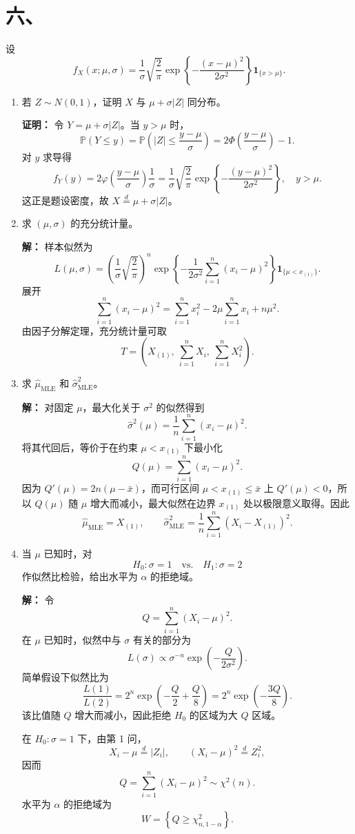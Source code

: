 \documentclass[UTF8,zihao=-4,fontset=windows]{ctexart}
\newcommand{\Prob}{\mathbb P}
\newcommand{\ind}{\mathbf 1}
\newcommand{\ans}[1]{\textcolor{ansblue}{\textbf{#1}}}
\begin{document}
\section*{六、}
设
\[
  f_X(x;\mu,\sigma)=
  \frac{1}{\sigma}\sqrt{\frac2\pi}
  \exp\left\{-\frac{(x-\mu)^2}{2\sigma^2}\right\}\ind_{\{x>\mu\}}.
\]

\begin{enumerate}
  \item 若 $Z\sim N(0,1)$，证明 $X$ 与 $\mu+\sigma |Z|$ 同分布。

  \ans{证明：} 令 $Y=\mu+\sigma|Z|$。当 $y>\mu$ 时，
  \[
    \Prob(Y\le y)=\Prob\left(|Z|\le \frac{y-\mu}{\sigma}\right)
    =2\Phi\left(\frac{y-\mu}{\sigma}\right)-1.
  \]
  对 $y$ 求导得
  \[
    f_Y(y)=2\varphi\left(\frac{y-\mu}{\sigma}\right)\frac1\sigma
    =\frac1\sigma\sqrt{\frac2\pi}
      \exp\left\{-\frac{(y-\mu)^2}{2\sigma^2}\right\},\quad y>\mu.
  \]
  这正是题设密度，故 $X\overset d=\mu+\sigma|Z|$。

  \item 求 $(\mu,\sigma)$ 的充分统计量。

  \ans{解：} 样本似然为
  \[
    L(\mu,\sigma)
    =\left(\frac1\sigma\sqrt{\frac2\pi}\right)^n
      \exp\left\{-\frac{1}{2\sigma^2}\sum_{i=1}^n(x_i-\mu)^2\right\}
      \ind_{\{\mu<x_{(1)}\}}.
  \]
  展开
  \[
    \sum_{i=1}^n(x_i-\mu)^2=\sum_{i=1}^n x_i^2-2\mu\sum_{i=1}^n x_i+n\mu^2.
  \]
  由因子分解定理，充分统计量可取
  \[
    \boxed{T=\left(X_{(1)},\ \sum_{i=1}^n X_i,\ \sum_{i=1}^n X_i^2\right).}
  \]

  \item 求 $\hat\mu_{\mathrm{MLE}}$ 和 $\hat\sigma^2_{\mathrm{MLE}}$。

  \ans{解：} 对固定 $\mu$，最大化关于 $\sigma^2$ 的似然得到
  \[
    \hat\sigma^2(\mu)=\frac1n\sum_{i=1}^n(x_i-\mu)^2.
  \]
  将其代回后，等价于在约束 $\mu<x_{(1)}$ 下最小化
  \[
    Q(\mu)=\sum_{i=1}^n(x_i-\mu)^2.
  \]
  因为 $Q'(\mu)=2n(\mu-\bar x)$，而可行区间 $\mu<x_{(1)}\le \bar x$ 上 $Q'(\mu)<0$，所以 $Q(\mu)$ 随 $\mu$ 增大而减小，最大似然在边界 $x_{(1)}$ 处以极限意义取得。因此
  \[
    \boxed{\hat\mu_{\mathrm{MLE}}=X_{(1)},\qquad
    \hat\sigma^2_{\mathrm{MLE}}=\frac1n\sum_{i=1}^n(X_i-X_{(1)})^2.}
  \]

  \item 当 $\mu$ 已知时，对
  \[
    H_0:\sigma=1\quad \text{vs.}\quad H_1:\sigma=2
  \]
  作似然比检验，给出水平为 $\alpha$ 的拒绝域。

  \ans{解：} 令
  \[
    Q=\sum_{i=1}^n(X_i-\mu)^2.
  \]
  在 $\mu$ 已知时，似然中与 $\sigma$ 有关的部分为
  \[
    L(\sigma)\propto \sigma^{-n}\exp\left(-\frac{Q}{2\sigma^2}\right).
  \]
  简单假设下似然比为
  \[
    \frac{L(1)}{L(2)}
    =2^n\exp\left(-\frac{Q}{2}+\frac{Q}{8}\right)
    =2^n\exp\left(-\frac{3Q}{8}\right).
  \]
  该比值随 $Q$ 增大而减小，因此拒绝 $H_0$ 的区域为大 $Q$ 区域。

  在 $H_0:\sigma=1$ 下，由第 1 问，
  \[
    X_i-\mu\overset d=|Z_i|,\qquad (X_i-\mu)^2\overset d=Z_i^2,
  \]
  因而
  \[
    Q=\sum_{i=1}^n(X_i-\mu)^2\sim\chi^2(n).
  \]
  水平为 $\alpha$ 的拒绝域为
  \[
    \boxed{W=\left\{Q\ge \chi^2_{n,1-\alpha}\right\}.}
  \]
\end{enumerate}
\end{document}
